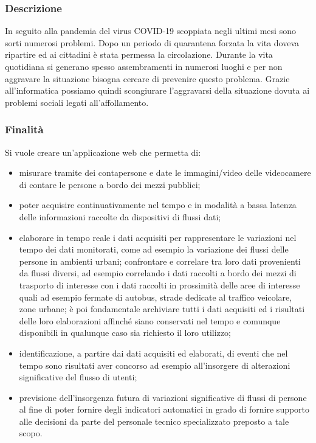 \documentclass[]{article}
\begin{document}
		\subsubsection{Descrizione}
		In seguito alla pandemia del virus COVID-19 scoppiata negli ultimi mesi sono sorti numerosi problemi. Dopo un periodo di quarantena forzata la vita doveva ripartire ed ai cittadini è stata permessa la circolazione. Durante la vita quotidiana si generano spesso assembramenti in numerosi luoghi e per non aggravare la situazione bisogna cercare di prevenire questo problema. Grazie all’informatica possiamo quindi scongiurare l’aggravarsi della situazione dovuta ai problemi sociali legati all’affollamento.

		\subsubsection{Finalità}
		Si vuole creare un’applicazione web che permetta di:
		\begin{itemize}
		\item misurare tramite dei contapersone e date le immagini/video delle videocamere di contare le persone a bordo dei mezzi pubblici;
		\item poter acquisire continuativamente nel tempo e in modalità a bassa latenza delle informazioni raccolte da dispositivi di flussi dati;
		\item elaborare in tempo reale i dati acquisiti per rappresentare le variazioni nel tempo dei dati monitorati, come ad esempio la variazione dei flussi delle persone in ambienti urbani; confrontare e correlare tra loro dati provenienti da flussi diversi, ad esempio correlando i dati raccolti a bordo dei mezzi di trasporto di interesse con i dati raccolti in prossimità delle aree di interesse quali ad esempio fermate di autobus, strade dedicate al traffico veicolare, zone urbane; è poi fondamentale archiviare tutti i dati acquisiti ed i risultati delle loro elaborazioni affinché siano conservati nel tempo e comunque disponibili in qualunque caso sia richiesto il loro utilizzo;
		\item identificazione, a partire dai dati acquisiti ed elaborati, di eventi che nel tempo sono risultati aver concorso ad esempio all’insorgere di alterazioni significative del flusso di utenti;
		\item previsione dell’insorgenza futura di variazioni significative di flussi di persone al fine di poter fornire degli indicatori automatici in grado di fornire supporto alle decisioni da parte del personale tecnico specializzato preposto a tale scopo.
		\end{itemize}
\end{document}
